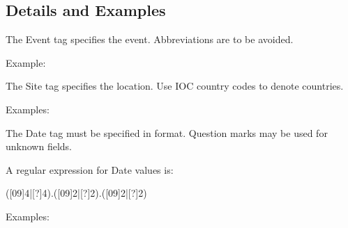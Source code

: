 \documentclass[letterpaper,10pt,english]{sphinxmanual}
\begin{document}
\subsection{Details and Examples}
\label{\detokenize{pdntags:details-and-examples}}\begin{description}
\sphinxAtStartPar
The Event tag specifies the event. Abbreviations are to be avoided.

\sphinxAtStartPar
Example:

\begin{sphinxVerbatim}[commandchars=\\\{\}]
\PYG{p}{[} \PYG{p}{]}
\end{sphinxVerbatim}

\sphinxAtStartPar
The Site tag specifies the location. Use IOC country codes to denote
countries.

\sphinxAtStartPar
Examples:

\begin{sphinxVerbatim}[commandchars=\\\{\}]
\PYG{p}{[} \PYG{p}{]}
\PYG{p}{[} \PYG{p}{]}
\PYG{p}{[} \PYG{p}{]}
\end{sphinxVerbatim}

\sphinxAtStartPar
The Date tag must be specified in  format. Question
marks may be used for unknown fields.

\sphinxAtStartPar
A regular expression for Date values is:

\begin{sphinxVerbatim}[commandchars=\\\{\}]
([0\PYGZhy{}9]\PYGZob{}4\PYGZcb{}|[?]\PYGZob{}4\PYGZcb{})\PYGZbs{}.([0\PYGZhy{}9]\PYGZob{}2\PYGZcb{}|[?]\PYGZob{}2\PYGZcb{})\PYGZbs{}.([0\PYGZhy{}9]\PYGZob{}2\PYGZcb{}|[?]\PYGZob{}2\PYGZcb{})
\end{sphinxVerbatim}

\sphinxAtStartPar
Examples:

\begin{sphinxVerbatim}[commandchars=\\\{\}]
\PYG{p}{[} \PYG{p}{]}
\PYG{p}{[} \PYG{p}{]}
\end{sphinxVerbatim}

\end{description}
\end{document}
